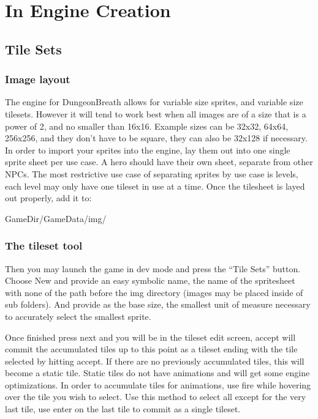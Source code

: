 \documentclass[11pt,fleqn]{book} %
\begin{document}

\chapter{In Engine Creation}

\section{Tile Sets}

\subsection{Image layout}

The engine for DungeonBreath allows for variable size sprites, and variable size tilesets. However it will tend to work best when all images are of a size
that is a power of 2, and no smaller than 16x16. Example sizes can be 32x32, 64x64, 256x256, and they don't have to be square, they can also be 32x128 if necessary.
In order to import your sprites into the engine, lay them out into one single sprite sheet per use case. A hero should have their own sheet, separate from other
NPCs. The most restrictive use case of separating sprites by use case is levels, each level may only have one tileset in use at a time.
Once the tilesheet is layed out properly, add it to:
\begin{theorem}
GameDir/GameData/img/
\end{theorem}

\subsection{The tileset tool}
Then you may launch the game in dev mode and press the ``Tile Sets'' button. Choose New and provide an easy symbolic name, the name of the spritesheet with none of the 
path before the img directory (images may be placed inside of sub folders). And provide as the base size, the smallest unit of measure necessary to accurately select
the smallest sprite.

Once finished press next and you will be in the tileset edit screen, accept will commit the accumulated tiles up to this point as a tileset ending with the tile selected
by hitting accept. If there are no previously accumulated tiles, this will become a static tile. Static tiles do not have animations and will get some engine optimizations.
In order to accumulate tiles for animations, use fire while hovering over the tile you wish to select. Use this method to select all except for the very last tile, use enter 
on the last tile to commit as a single tileset.
\end{document}
